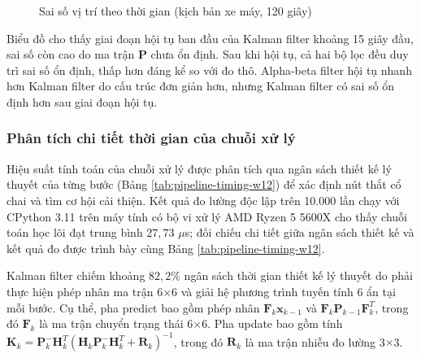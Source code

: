 \begin{figure}[H]
\centering
{}
\caption{Sai số vị trí theo thời gian (kịch bản xe máy, 120 giây)}
\label{fig:error-over-time}
\end{figure}

Biểu đồ cho thấy giai đoạn hội tụ ban đầu của Kalman filter khoảng 15 giây đầu, sai số còn cao do ma trận $\mathbf{P}$ chưa ổn định. Sau khi hội tụ, cả hai bộ lọc đều duy trì sai số ổn định, thấp hơn đáng kể so với đo thô. Alpha-beta filter hội tụ nhanh hơn Kalman filter do cấu trúc đơn giản hơn, nhưng Kalman filter có sai số ổn định hơn sau giai đoạn hội tụ.

\subsubsection{Phân tích chi tiết thời gian của chuỗi xử lý}

\hspace{0.5cm} Hiệu suất tính toán của chuỗi xử lý được phân tích qua ngân sách thiết kế lý thuyết của từng bước (Bảng \ref{tab:pipeline-timing-w12}) để xác định nút thắt cổ chai và tìm cơ hội cải thiện. Kết quả đo lường độc lập trên 10.000 lần chạy với CPython 3.11 trên máy tính có bộ vi xử lý AMD Ryzen 5 5600X cho thấy chuỗi toán học lõi đạt trung bình $27{,}73$ $\mu$s; đối chiếu chi tiết giữa ngân sách thiết kế và kết quả đo được trình bày cùng Bảng \ref{tab:pipeline-timing-w12}.

Kalman filter chiếm khoảng $82{,}2\%$ ngân sách thời gian thiết kế lý thuyết do phải thực hiện phép nhân ma trận 6$\times$6 và giải hệ phương trình tuyến tính 6 ẩn tại mỗi bước. Cụ thể, pha predict bao gồm phép nhân $\mathbf{F}_k \mathbf{x}_{k-1}$ và $\mathbf{F}_k \mathbf{P}_{k-1} \mathbf{F}_k^T$, trong đó $\mathbf{F}_k$ là ma trận chuyển trạng thái 6$\times$6. Pha update bao gồm tính $\mathbf{K}_k = \mathbf{P}_k^- \mathbf{H}_k^T (\mathbf{H}_k \mathbf{P}_k^- \mathbf{H}_k^T + \mathbf{R}_k)^{-1}$, trong đó $\mathbf{R}_k$ là ma trận nhiễu đo lường 3$\times$3.

